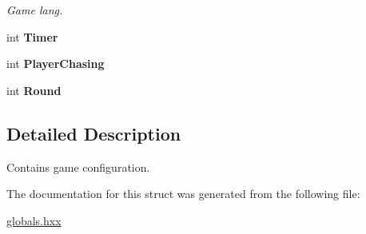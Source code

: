 \begin{DoxyCompactItemize}
\begin{DoxyCompactList}\small\item\em Game lang. \end{DoxyCompactList}\item 
\hypertarget{struct_chase_game_1_1_s_game_status_a66573bd6f5d8bde84c2b10695d70e181}{int {\bfseries Timer}}\label{struct_chase_game_1_1_s_game_status_a66573bd6f5d8bde84c2b10695d70e181}

\item 
\hypertarget{struct_chase_game_1_1_s_game_status_afc922b1f3d84c7c9289d7d0eaacf904d}{int {\bfseries Player\-Chasing}}\label{struct_chase_game_1_1_s_game_status_afc922b1f3d84c7c9289d7d0eaacf904d}

\item 
\hypertarget{struct_chase_game_1_1_s_game_status_a8bef1eae750f52625ca337be30373296}{int {\bfseries Round}}\label{struct_chase_game_1_1_s_game_status_a8bef1eae750f52625ca337be30373296}

\end{DoxyCompactItemize}


\subsection{Detailed Description}
Contains game configuration. 

The documentation for this struct was generated from the following file\-:\begin{DoxyCompactItemize}
\item 
\hyperlink{globals_8hxx}{globals.\-hxx}\end{DoxyCompactItemize}
